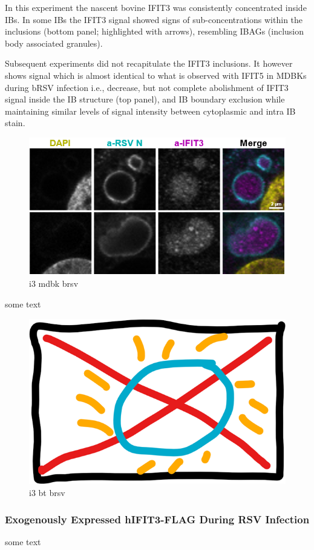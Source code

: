 In this experiment the nascent bovine IFIT3 was consistently concentrated inside IBs. In some IBs the IFIT3 signal showed signs of sub-concentrations within the inclusions (bottom panel; highlighted with arrows), resembling IBAGs (inclusion body associated granules).

Subsequent experiments did not recapitulate the IFIT3 inclusions. It however shows signal which is almost identical to what is observed with IFIT5 in MDBKs during bRSV infection i.e., decrease, but not complete abolishment of IFIT3 signal inside the IB structure (top panel), and IB boundary exclusion while maintaining similar levels of signal intensity between cytoplasmic and intra IB stain.

\begin{figure}
    \centering
    \includegraphics[width=1\linewidth]{08. Chapter 3/Figs/04. IFIT3/04. mdbk brsv.png}
    \caption[i3 mdbk brsv]{i3 mdbk brsv}
    \label{i3 mdbk brsv}
\end{figure}

some text

\begin{figure}
    \centering
    \includegraphics[width=0.5\linewidth]{06. Chapter 1//Figs/00. placeholder.png}
    \caption[i3 bt brsv]{i3 bt brsv}
    \label{i3 bt brsv}
\end{figure}

\subsubsection{Exogenously Expressed hIFIT3-FLAG During RSV Infection} \label{Exogenously Expressed hIFIT3-FLAG During RSV Infection}
some text

